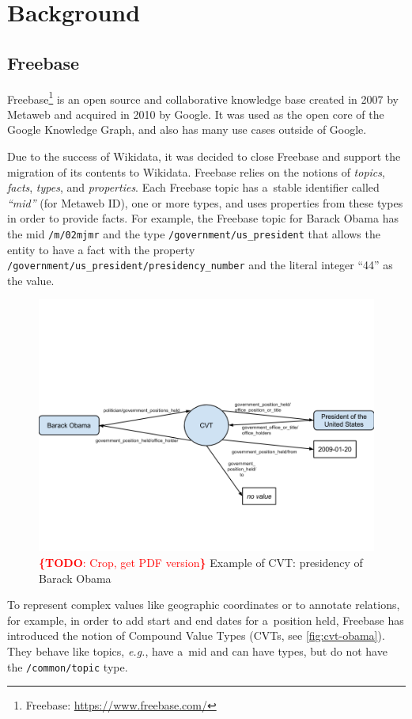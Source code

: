 \documentclass{sig-alternate}
\newcommand{\todo}[1]{\noindent\textcolor{red}{{\bf \{TODO}: #1{\bf \}}}}
\begin{document}
\section{Background}\label{sec:background}

\subsection{Freebase}

Freebase\footnote{Freebase: \url{https://www.freebase.com/}} is an open source and
collaborative knowledge base created in 2007 by Metaweb and acquired in 2010 by Google.
It was used as the open core of the Google Knowledge Graph,
and also has many use cases outside of Google.

Due to the success of Wikidata,
it was decided to close Freebase and support the migration of its contents to Wikidata.
Freebase relies on the notions of \emph{topics}, \emph{facts}, \emph{types}, and \emph{properties}.
Each Freebase topic has a~stable identifier called \emph{``mid''} (for Metaweb ID),
one or more types, and uses properties from these types in order to provide facts.
For example, the Freebase topic for Barack Obama has the mid \texttt{/m/02mjmr}
and the type \texttt{/government/us\_president} that allows the entity to have
a fact with the property \texttt{/government/us\_president/presidency\_number}
and the literal integer ``44'' as the value.

\begin{figure}[!htbp]
\centering
\includegraphics[width=8.45 cm]{img/freebase-cvt-obama.png}
\caption{\todo{Crop, get PDF version} Example of CVT: presidency of Barack Obama}
\label{fig:cvt-obama}
\end{figure}

To represent complex values like geographic coordinates or to annotate relations,
for example, in order to add start and end dates for a~position held,
Freebase has introduced the notion of Compound Value Types (CVTs, see \autoref{fig:cvt-obama}).
They behave like topics, \emph{e.g.}, have a~mid and can have types,
but do not have the \texttt{/common/topic} type.
\end{document}
